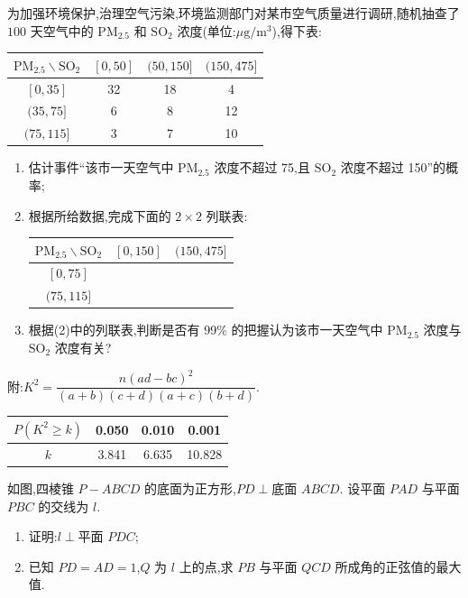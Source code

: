 \begin{problem}
为加强环境保护,治理空气污染,环境监测部门对某市空气质量进行调研,随机抽查了 \(100\) 天空气中的 \(\mathrm{PM}_{2.5}\) 和 \(\mathrm{SO}_2\) 浓度(单位:\(\mu\mathrm{g}/\mathrm{m}^3\)),得下表:

\begin{center}
\begin{tabular}{c|ccc}
\(\mathrm{PM}_{2.5}\backslash\mathrm{SO}_2\) & \([0,50]\) & \((50,150]\) & \((150,475]\) \\
\hline
\([0,35]\) & 32 & 18 & 4 \\
\((35,75]\) & 6 & 8 & 12 \\
\((75,115]\) & 3 & 7 & 10 \\
\end{tabular}
\end{center}

\begin{enumerate}
\item 估计事件``该市一天空气中 \(\mathrm{PM}_{2.5}\) 浓度不超过 75,且 \(\mathrm{SO}_2\) 浓度不超过 150''的概率;
\item 根据所给数据,完成下面的 \(2\times 2\) 列联表:

\begin{center}
\begin{tabular}{c|cc}
\(\mathrm{PM}_{2.5}\backslash\mathrm{SO}_2\) & \([0,150]\) & \((150,475]\) \\
\hline
\([0,75]\) & & \\
\((75,115]\) & & \\
\end{tabular}
\end{center}

\item 根据(2)中的列联表,判断是否有 99\% 的把握认为该市一天空气中 \(\mathrm{PM}_{2.5}\) 浓度与 \(\mathrm{SO}_2\) 浓度有关?
\end{enumerate}

附:\(K^2=\dfrac{n(ad-bc)^2}{(a+b)(c+d)(a+c)(b+d)}\).

\begin{center}
\begin{tabular}{c|ccc}
\(P(K^2\ge k)\) & 0.050 & 0.010 & 0.001 \\
\hline
\(k\) & 3.841 & 6.635 & 10.828 \\
\end{tabular}
\end{center}
\end{problem}

\begin{problem}
如图,四棱锥 \(P-ABCD\) 的底面为正方形,\(PD\perp\)底面 \(ABCD\). 设平面 \(PAD\) 与平面 \(PBC\) 的交线为 \(l\).

\begin{enumerate}
\item 证明:\(l\perp\)平面 \(PDC\);
\item 已知 \(PD=AD=1\),\(Q\) 为 \(l\) 上的点,求 \(PB\) 与平面 \(QCD\) 所成角的正弦值的最大值.
\end{enumerate}

\end{problem}

